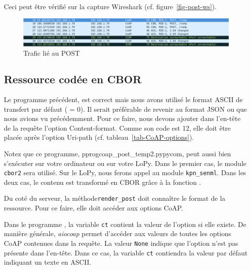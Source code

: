          \vspace{1em}


Ceci peut être vérifié sur la capture Wireshark (cf. figure~\vref{fig-post-ws}).

\begin{figure}[tbp]
\centerline{\includegraphics[width=1\columnwidth]{Pictures/coap-ws.png}}
\caption{Trafic lié au POST}
\label{fig-post-ws}
\end{figure}


\subsection{Ressource codée en CBOR}

Le programme précédent, est correct mais nous avons utilisé le format ASCII de transfert par défaut (\textit{} = 0). Il serait préférable de revenir au format JSON ou  que nous avions vu précédemment. Pour ce faire, nous devons ajouter dans l’en-tête de la requête l’option Content-format. Comme son code est 12, elle doit être placée après l’option Uri-path (cf. tableau~\vref{tab-CoAP-options}).


Notez que ce programme,  pprog{coap\_post\_temp2.py}{pycom},  peut aussi bien s'exécuter sur votre ordinateur ou sur votre LoPy. Dans le premier cas, le module \texttt{cbor2} sera utilisé. Sur le LoPy, nous ferons appel au module \texttt{kpn\_senml}. Dans les deux cas, le contenu est transformé en CBOR grâce à la fonction .

         \vspace{1em}

Du coté du serveur, la méthode\texttt{render\_post} doit connaître le format de la ressource. Pour ce faire, elle doit accéder aux options CoAP.


Dans le programme , la variable \texttt{ct} contient la valeur de l’option  si elle existe. De manière générale, \textit{aiocoap} permet d’accéder aux valeurs de toutes les options CoAP contenues dans la requête. La valeur \texttt{None} indique que l’option n’est pas présente dans l’en-tête. Dans ce cas, la variable \texttt{ct} contiendra la valeur par défaut indiquant un texte en ASCII.

